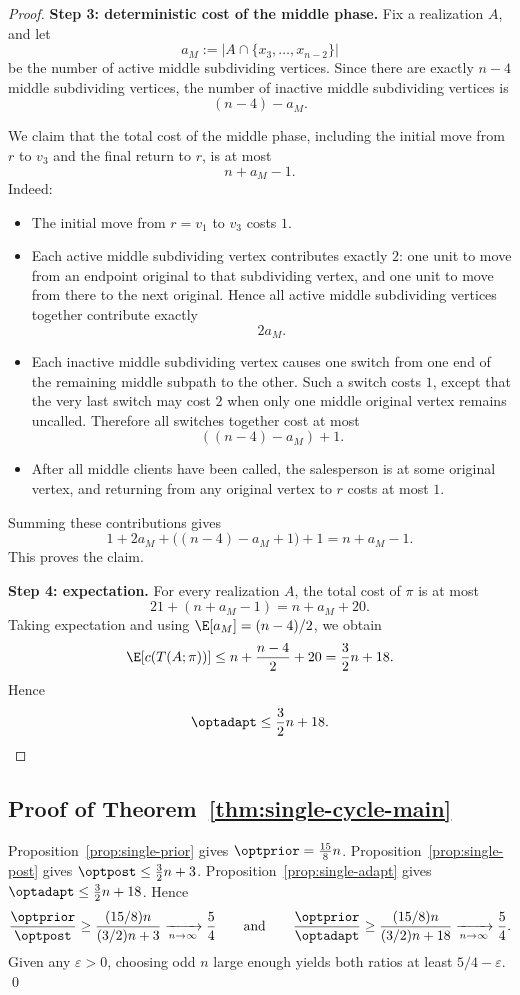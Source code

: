 \begin{proof}
\medskip
\noindent\textbf{Step 3: deterministic cost of the middle phase.}
Fix a realization $A$, and let
\[
a_M:=|A\cap\{x_3,\dots,x_{n-2}\}|
\]
be the number of active middle subdividing vertices. Since there are exactly $n-4$ middle subdividing vertices, the number of inactive middle subdividing vertices is
\[
(n-4)-a_M.
\]

We claim that the total cost of the middle phase, including the initial move from $r$ to $v_3$ and the final return to $r$, is at most
\[
n+a_M-1.
\]
Indeed:

\begin{itemize}
    \item The initial move from $r=v_1$ to $v_3$ costs $1$.
    \item Each active middle subdividing vertex contributes exactly $2$: one unit to move from an endpoint original to that subdividing vertex, and one unit to move from there to the next original. Hence all active middle subdividing vertices together contribute exactly
    \[
    2a_M.
    \]
    \item Each inactive middle subdividing vertex causes one switch from one end of the remaining middle subpath to the other. Such a switch costs $1$, except that the very last switch may cost $2$ when only one middle original vertex remains uncalled. Therefore all switches together cost at most
    \[
    ((n-4)-a_M)+1.
    \]
    \item After all middle clients have been called, the salesperson is at some original vertex, and returning from any original vertex to $r$ costs at most $1$.
\end{itemize}

Summing these contributions gives
\[
1+2a_M+\bigl((n-4)-a_M+1\bigr)+1=n+a_M-1.
\]
This proves the claim.

\medskip
\noindent\textbf{Step 4: expectation.}
For every realization $A$, the total cost of $\pi$ is at most
\[
21+(n+a_M-1)=n+a_M+20.
\]
Taking expectation and using $\E[a_M]=(n-4)/2$, we obtain
\[
\E[c(T(A;\pi))]
\le n+\frac{n-4}{2}+20
=\frac32 n+18.
\]
Hence
\[
\optadapt\le \frac32 n+18.
\]
\end{proof}

\subsection*{Proof of Theorem~\ref{thm:single-cycle-main}}

Proposition~\ref{prop:single-prior} gives $\optprior=\frac{15}{8}n$. Proposition~\ref{prop:single-post} gives $\optpost\le \frac32 n+3$. Proposition~\ref{prop:single-adapt} gives $\optadapt\le \frac32 n+18$. Hence
\[
\frac{\optprior}{\optpost}
\ge
\frac{(15/8)n}{(3/2)n+3}
\xrightarrow[n\to\infty]{} \frac54
\qquad\text{and}\qquad
\frac{\optprior}{\optadapt}
\ge
\frac{(15/8)n}{(3/2)n+18}
\xrightarrow[n\to\infty]{} \frac54.
\]
Given any $\varepsilon>0$, choosing odd $n$ large enough yields both ratios at least $5/4-\varepsilon$. \qed
